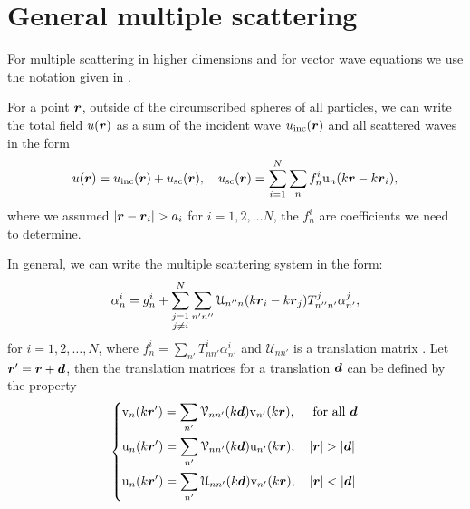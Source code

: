 \documentclass[ 12pt, a4paper]{article}
\begin{document}
\section{General multiple scattering}

For multiple scattering in higher dimensions and for vector wave equations we use the notation given in \cite{gower2020effective}.

For a point $\boldsymbol{r}$, outside of the circumscribed spheres of all particles, we can write the total field $u(\boldsymbol{r})$ as a sum of the incident wave $u_{\mathrm{inc}}(\boldsymbol{r})$ and all scattered waves in the form~\cite{Kristensson2015a,Kristensson2016,Linton+Martin2006}
\begin{equation} \label{eqn:total_discrete_wave}
    u(\boldsymbol{r}) = u_{\mathrm{inc}}(\boldsymbol{r}) + u_{\mathrm{sc}}(\boldsymbol{r}), \quad u_{\mathrm{sc}}(\boldsymbol{r}) =  \sum_{i=1}^N \sum_n f_n^i \mathrm u_n (k \boldsymbol{r} - k \boldsymbol{r}_i),
\end{equation}
where we assumed $ |\boldsymbol{r} - \boldsymbol{r}_i| > a_i $ for $i=1,2,\ldots N$, the $f_n^i$ are coefficients we need to determine. 

In general, we can write the multiple scattering system in the form:
\begin{equation}\label{eqn:multiple-scattering-general}
   \alpha_n^i = g_{n}^i
    +\sum_{\substack{j=1\\j\neq i}}^N \sum_{n' n''}\mathcal{U}_{n''n}(k\boldsymbol{r}_i - k\boldsymbol{r}_j)T_{n''n'}^j \alpha_{n'}^j,
\end{equation}
for $i=1,2,\ldots,N$, where $f_n^i = \sum_{n'} T^i_{nn'}\alpha_{n'}^i$ and $\mathcal{U}_{nn'}$ is a translation matrix \cite{Bostrom+Kristensson+Strom1991,Friedman+Russek1954}. Let $\boldsymbol{r}'=\boldsymbol{r}+\boldsymbol{d}$, then
the translation matrices for a translation $\boldsymbol{d}$ can be defined by the property~\cite{Bostrom+Kristensson+Strom1991}
  \begin{equation}\label{eq:translation_spherical_waves}
 \left\{\begin{aligned}
   &\mathrm{v}_n(k\rv')=\sum_{n'}\mathcal{V}_{nn'}(k\dv)\mathrm{v}_{n'}(k\rv),\quad \text{ for all }\dv
   \\
 &\mathrm{u}_n(k\rv')=\sum_{n'}\mathcal{V}_{nn'}(k\dv)\mathrm{u}_{n'}(k\rv),\quad |\rv|>|\dv|
 \\
   &\mathrm{u}_n(k\rv')=\sum_{n'}\mathcal{U}_{nn'}(k\dv)\mathrm{v}_{n'}(k\rv),\quad |\rv|<|\dv|
   \\
 \end{aligned}\right.
 \end{equation}
\end{document}

